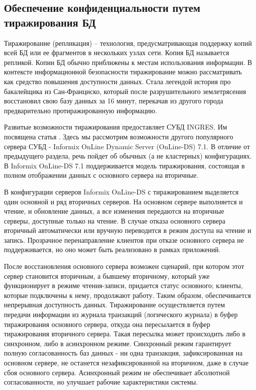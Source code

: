 \subsection{Обеспечение конфиденциальности путем тиражирования БД}

Тиражирование (репликация) – технология, предусматривающая поддержку
копий всей БД или ее фрагментов в нескольких узлах сети. Копия БД называется
репликой. Копии БД обычно приближены к местам использования информации.
В контексте информационной безопасности тиражирование можно рассматривать как средство повышения
доступности данных. Стала легендой история про бакалейщика из Сан-Франциско, который после
разрушительного землетрясения восстановил свою базу данных за 16 минут, перекачав из другого
города предварительно протиражированную информацию.

Развитые возможности тиражирования предоставляет СУБД INGRES.
Им посвящена статья \cite{BeynonDavies}. Здесь мы рассмотрим возможности другого популярного сервера
СУБД - Informix OnLine Dynamic Server (OnLine-DS) 7.1. В отличие от предыдущего раздела, речь
пойдет об обычных (а не кластерных) конфигурациях.
В Informix OnLine-DS 7.1 поддерживается модель тиражирования, состоящая в полном отображении данных
с основного сервера на вторичные.

В конфигурации серверов Informix OnLine-DS с тиражированием выделяется один основной и ряд
вторичных серверов. На основном сервере выполняется и чтение, и обновление данных, а все изменения
передаются на вторичные серверы, доступные только на чтение. В случае отказа основного сервера
вторичный автоматически или вручную переводится в режим доступа на чтение и запись. Прозрачное
перенаправление клиентов при отказе основного сервера не поддерживается, но оно может быть
реализовано в рамках приложений.

После восстановления основного сервера возможен сценарий, при котором этот сервер становится
вторичным, а бывшему вторичному, который уже функционирует в режиме чтения-записи, придается
статус основного; клиенты, которые подключены к нему, продолжают работу. Таким образом,
обеспечивается непрерывная доступность данных.
Тиражирование осуществляется путем передачи информации из журнала транзакций (логического журнала)
в буфер тиражирования основного сервера, откуда она пересылается в буфер тиражирования вторичного
сервера. Такая пересылка может происходить либо в синхронном, либо в асинхронном режиме. Синхронный
режим гарантирует полную согласованность баз данных - ни одна транзакция, зафиксированная на
основном сервере, не останется незафиксированной на вторичном, даже в случае сбоя основного
сервера. Асинхронный режим не обеспечивает абсолютной согласованности, но улучшает рабочие
характеристики системы.

